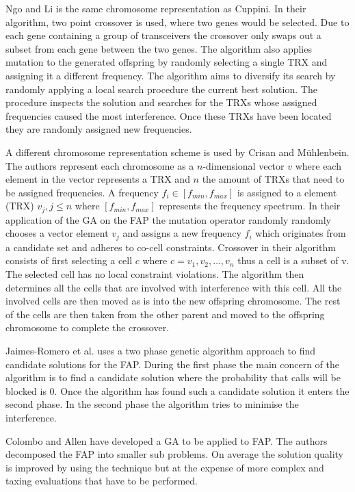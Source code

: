 Ngo and Li\cite{GANgoLi} is the same chromosome representation as Cuppini\cite{GACuppini}. In their algorithm, two point crossover is used, where two genes would be selected. Due to each gene containing a group of transceivers the crossover only swaps out a subset from each gene between the two genes. The algorithm also applies mutation to the generated offspring by randomly selecting a single TRX and assigning it a different frequency. The algorithm aims to diversify its search by randomly applying a local search procedure the current best solution. The procedure inspects the solution and searches for the TRXs whose assigned frequencies caused the most interference. Once these TRXs have been located they are randomly assigned new frequencies.

A different chromosome representation scheme is used by Crisan and M\"uhlenbein\cite{GACrisan}. The authors represent each chromosome as a $n$-dimensional vector $v$ where each element in the vector represents a TRX and $n$ the amount of TRXs that need to be assigned frequencies. A frequency $f_i \in [f_{min}, f_{max}]$ is assigned to a element (TRX) $v_j, j \le n$ where $[f_{min}, f_{max}]$ represents the frequency spectrum. In their application of the \gls{GA} on the FAP the mutation operator randomly randomly chooses a vector element $v_j$ and assigns a new frequency $f_i$ which originates from a candidate set and adheres to co-cell constraints. Crossover in their algorithm consists of first selecting a cell $c$ where $c = {v_1,v_2,\dots,v_n}$ thus a cell is a subset of v. The selected cell has no local constraint violations. The algorithm then determines all the cells that are involved with interference with this cell. All the involved cells are then moved as is into the new offspring chromosome. The rest of the cells are then taken from the other parent and moved to the offspring chromosome to complete the crossover.

Jaimes-Romero et al.\cite{GAJaimes} uses a two phase genetic algorithm approach to find candidate solutions for the \gls{FAP}. During the first phase the main concern of the algorithm is to find a candidate solution where the probability that calls will be blocked is 0. Once the algorithm has found such a candidate solution it enters the second phase. In the second phase the algorithm tries to minimise the interference. 

Colombo and Allen\cite{ProblemDecompMIFAP} have developed a \gls{GA} to be applied to \gls{FAP}. The authors decomposed the \gls{FAP} into smaller sub problems. On average the solution quality is improved by using the technique but at the expense of more complex and taxing evaluations that have to be performed\cite{ProblemDecompMIFAP}. 

